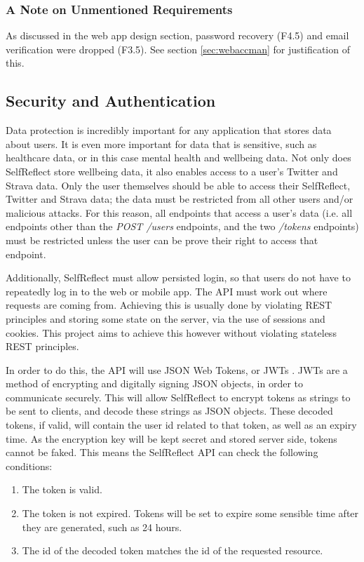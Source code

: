 \documentclass[11pt,openright,a4paper]{report}
\begin{document}
\subsubsection{A Note on Unmentioned Requirements}
As discussed in the web app design section, password recovery (F4.5) and email verification were dropped (F3.5). See section \ref{sec:webaccman} for justification of this.

\subsection{Security and Authentication} \label{sec:apisecurity}
Data protection is incredibly important for any application that stores data about users. It is even more important for data that is sensitive, such as healthcare data, or in this case mental health and wellbeing data. Not only does SelfReflect store wellbeing data, it also enables access to a user's Twitter and Strava data. Only the user themselves should be able to access their SelfReflect, Twitter and Strava data; the data must be restricted from all other users and/or malicious attacks. For this reason, all endpoints that access a user's data (i.e. all endpoints other than the \emph{POST /users} endpoints, and the two \emph{/tokens} endpoints) must be restricted unless the user can be prove their right to access that endpoint.

Additionally, SelfReflect must allow persisted login, so that users do not have to repeatedly log in to the web or mobile app. The API must work out where requests are coming from. Achieving this is usually done by violating REST principles and storing some state on the server, via the use of sessions and cookies. This project aims to achieve this however without violating stateless REST principles.

In order to do this, the API will use JSON Web Tokens, or JWTs \parencite{jwtrfc}. JWTs are a method of encrypting and digitally signing JSON objects, in order to communicate securely. This will allow SelfReflect to encrypt tokens as strings to be sent to clients, and decode these strings as JSON objects. These decoded tokens, if valid, will contain the user id related to that token, as well as an expiry time. As the encryption key will be kept secret and stored server side, tokens cannot be faked. This means the SelfReflect API can check the following conditions:
\begin{enumerate}
\item The token is valid.
\item The token is not expired. Tokens will be set to expire some sensible time after they are generated, such as 24 hours.
\item The id of the decoded token matches the id of the requested resource.
\end{enumerate}
\end{document}
